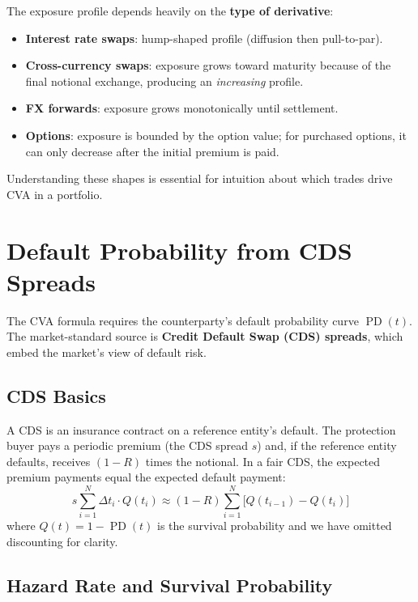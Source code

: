 \documentclass[11pt, a4paper]{article}
\theoremstyle{definition}
\theoremstyle{plain}
\theoremstyle{remark}
\newcommand{\PD}{\operatorname{PD}}
\begin{document}
\begin{keyidea}
The exposure profile depends heavily on the \textbf{type of derivative}:
\begin{itemize}
    \item \textbf{Interest rate swaps}: hump-shaped profile (diffusion then pull-to-par).
    \item \textbf{Cross-currency swaps}: exposure grows toward maturity because of
          the final notional exchange, producing an \emph{increasing} profile.
    \item \textbf{FX forwards}: exposure grows monotonically until settlement.
    \item \textbf{Options}: exposure is bounded by the option value;
          for purchased options, it can only decrease after the initial premium is paid.
\end{itemize}
Understanding these shapes is essential for intuition about which trades
drive CVA in a portfolio.
\end{keyidea}

\section{Default Probability from CDS Spreads}
\label{sec:default-probability}

The CVA formula requires the counterparty's default probability curve $\PD(t)$.
The market-standard source is \textbf{Credit Default Swap (CDS) spreads},
which embed the market's view of default risk.

\subsection{CDS Basics}

A CDS is an insurance contract on a reference entity's default.
The protection buyer pays a periodic premium (the CDS spread $s$) and,
if the reference entity defaults, receives $(1 - R)$ times the notional.
In a fair CDS, the expected premium payments equal the expected default payment:
\[
    s \sum_{i=1}^{N} \Delta t_i \cdot Q(t_i)
    \approx (1 - R)\sum_{i=1}^{N} \bigl[Q(t_{i-1}) - Q(t_i)\bigr]
\]
where $Q(t) = 1 - \PD(t)$ is the survival probability and we have omitted discounting
for clarity.

\subsection{Hazard Rate and Survival Probability}
\end{document}

